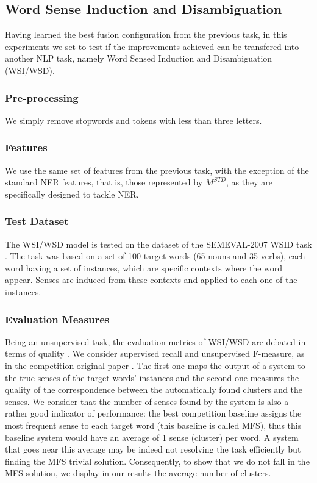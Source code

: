 \subsection{Word Sense Induction and Disambiguation}
Having learned the best fusion configuration from the previous task, in this experiments we set to test if the improvements achieved can be transfered into another NLP task, namely Word Sensed Induction and Disambiguation (WSI/WSD).

\subsubsection{Pre-processing}
We simply remove stopwords and tokens with less than three letters.
\subsubsection{Features}
We use the same set of features from the previous task, with the exception of the standard NER features, that is, those represented by $M^{STD}$, as they are specifically designed to tackle NER.
\subsubsection{Test Dataset}
The WSI/WSD model is tested on the dataset of  the SEMEVAL-2007 WSID task \cite{Agirre2007}. The task was based on a set of 100 target words (65 nouns and 35 verbs), each  word having a set of instances, which are specific contexts where the word appear. Senses are induced from these contexts and applied to each one of the instances.


\subsubsection{Evaluation Measures}
Being an unsupervised task, the evaluation metrics of WSI/WSD are debated in terms of quality \cite{CruysA11}. We consider supervised recall and unsupervised F-measure, as in the competition original paper \cite{Agirre2007}. The first one maps the output of a system to the true senses of the target words' instances and the second one measures the quality of the correspondence between the automatically found clusters and the senses. 
We consider that the number of senses found by the system is also a rather good indicator of performance: the best competition baseline assigns the most frequent sense to each target word (this baseline is called MFS), thus this baseline system would have an average of 1 sense (cluster) per word. A system that goes near this average may be indeed not resolving the task efficiently but finding the MFS trivial solution. Consequently, to show that we do not fall in the MFS solution, we display in our results the average number of clusters.

